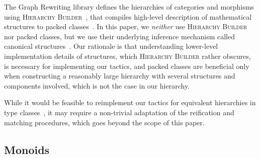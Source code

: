 \documentclass[a4paper,UKenglish,cleveref,autoref]{lipics-v2021}
\newcommand{\HB}{{\sffamily\scshape Hierarchy Builder}\xspace}
\begin{document}
The Graph Rewriting library defines the hierarchies of categories and morphisms~\cite[Sections 2 and
  3]{DBLP:conf/cpp/ArsacHP26} using \HB~\cite{DBLP:conf/fscd/CohenST20}, that compiles high-level
description of mathematical structures to packed classes~\cite{DBLP:conf/tphol/GarillotGMR09}.
In this paper, we \emph{neither} use \HB nor packed classes, but we use their underlying inference
mechanism called canonical structures~\cite{DBLP:conf/itp/MahboubiT13,rocqrefman:canonical}.
Our rationale is that understanding lower-level implementation details of structures, which \HB
rather obscures, is necessary for implementing our tactics, and packed classes are beneficial only
when constructing a reasonably large hierarchy with several structures and components involved,
which is not the case in our hierarchy.

While it would be feasible to reimplement our tactics for equivalent hierarchies in type
classes~\cite{DBLP:conf/tphol/SozeauO08,rocqrefman:typeclasses}, it may require a non-trivial
adaptation of the reification and matching procedures, which goes beyond the scope of this paper.

\subsection{Monoids}
\label{sec:monoids}
\end{document}
